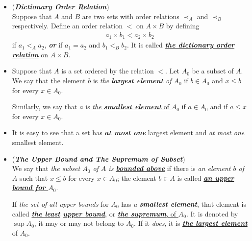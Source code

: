 \documentclass[11pt]{article}
\begin{document}
\begin{itemize}
\item \begin{definition}(\emph{\textbf{Dictionary Order Relation}})\\
Suppose that $A$ and $B$ are two sets with order relations  $\prec_A$ and $\prec_B$ respectively. Define an order relation $<$ on $A \times B$ by defining
\begin{align*}
a_1 \times b_1 < a_2 \times b_2
\end{align*}
if $a_1 <_A a_2$, \emph{\textbf{or}} if $a_1 = a_2$ and $b_1 <_B b_2$. It is called \underline{\emph{\textbf{the dictionary order relation}}} on $A \times B$.
\end{definition}

\item \begin{definition}
Suppose that $A$ is a set ordered by the relation $<$.  Let $A_0$ be a subset of $A$. We say that the element $b$ is \underline{\emph{the \textbf{largest element} of $A_0$}} if $b \in A_0$ and $x \le b$ for every $x \in A_0$. 

Similarly, we say that $a$ is \underline{\emph{the \textbf{smallest element}} of $A_0$} if $a \in A_0$ and if $a \le x$
for every $x \in A_0$. 
\end{definition}

\item \begin{remark}
It is easy to see that a set has \emph{\textbf{at most one}} largest element and \emph{at most one} smallest element.
\end{remark}

\item \begin{definition} (\emph{\textbf{The Upper Bound and The Supremum of Subset}})\\
We say that \emph{the subset $A_0$ of $A$ is \underline{\textbf{bounded above}}} if there is \emph{an element $b$ of $A$} such that $x \le b$ for every $x \in A_0$; the element $b \in A$ is called \underline{\emph{\textbf{an upper bound for $A_0$}}}. 

If \emph{the set of all upper bounds} for $A_0$ has \emph{a \textbf{smallest element}}, that element is called \emph{\textbf{\underline{the least} \underline{upper bound}}}, or \underline{\emph{\textbf{the supremum}}, of $A_0$}. It is denoted by $\sup A_0$, it may or may not belong to $A_0$. If it \emph{does}, it is \emph{\textbf{\underline{the largest element}}} of $A_0$.
\end{definition}


\end{itemize}
\end{document}
